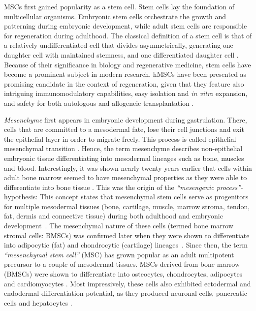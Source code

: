 \acp{MSC} first gained popularity as a stem cell. Stem cells lay the foundation
of multicellular organisms. Embryonic stem cells orchestrate the growth and
patterning during embryonic development, while adult stem cells are responsible
for regeneration during adulthood. The classical definition of a stem cell is
that of a relatively undifferentiated cell that divides asymmetrically,
generating one daughter cell with maintained stemness, and one differentiated
daughter cell \cite{cooperCellMolecularApproach2000,
    shenghuiMechanismsStemCell2009}. Because of their significance in biology and
regenerative medicine, stem cells have become a prominent subject in modern
research. \acp{hMSC} have been presented as promising candidate in the context
of regeneration, given that they feature also intriguing immunomodulatory
capabilities, easy isolation and \textit{in vitro} expansion, and safety for
both autologous and allogeneic transplantation
\cite{ullahHumanMesenchymalStem2015}.


\emph{Mesenchyme} first appears in embryonic development during gastrulation.
There, cells that are committed to a mesodermal fate, lose their cell junctions
and exit the epithelial layer in order to migrate freely. This process is called
epithelial-mesenchymal transition
\cite{tamFormationMesodermalTissues1987, nowotschinCellularDynamicsEarly2010}.
Hence, the term mesenchyme describes non-epithelial embryonic tissue
differentiating into mesodermal lineages such as bone, muscles and blood.
Interestingly, it was shown nearly twenty years earlier that cells within adult
bone marrow seemed to have mesenchymal properties as they were able to
differentiate into bone tissue
\cite{friedensteinOsteogenesisTransplantsBone1966,
    friedensteinOsteogenicPrecursorCells1971, biancoMesenchymalStemCells2014}. This
was the origin of the \emph{``mesengenic process''}-hypothesis: This concept
states that mesenchymal stem cells serve as progenitors for multiple mesodermal
tissues (bone, cartilage, muscle, marrow stroma, tendon, fat, dermis and
connective tissue) during both adulthood and embryonic
development~\cite{caplanMesenchymalStemCells1991,caplanMesengenicProcess1994}.
The mesenchymal nature of these cells (termed bone marrow stromal cells: \acp{BMSC})
was confirmed later when they were shown to differentiate into adipocytic (fat)
and chondrocytic (cartilage)
lineages~\cite{pittengerMultilineagePotentialAdult1999}. Since then, the term
\emph{``mesenchymal stem cell''} (MSC) has grown popular as an adult multipotent
precursor to a couple of mesodermal tissues. \acp{MSC} derived from bone marrow
(\acp{BMSC}) were shown to differentiate into osteocytes, chondrocytes, adipocytes
and cardiomyocytes \cite{gronthosSTRO1FractionAdult1994,
    muruganandanAdipocyteDifferentiationBone2009, xuMesenchymalStemCells2004}. Most
impressively, these cells also exhibited ectodermal and endodermal
differentiation potential, as they produced neuronal cells, pancreatic cells and
hepatocytes \cite{barzilayLentiviralDeliveryLMX1a2009,
    wilkinsHumanBoneMarrowderived2009, gabrInsulinproducingCellsAdult2013,
    stockHumanBoneMarrow2014}.

